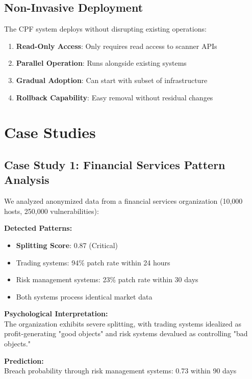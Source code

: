 \documentclass[11pt,a4paper]{article}
\begin{document}
\subsection{Non-Invasive Deployment}

The CPF system deploys without disrupting existing operations:

\begin{enumerate}
\item \textbf{Read-Only Access}: Only requires read access to scanner APIs
\item \textbf{Parallel Operation}: Runs alongside existing systems
\item \textbf{Gradual Adoption}: Can start with subset of infrastructure
\item \textbf{Rollback Capability}: Easy removal without residual changes
\end{enumerate}

\section{Case Studies}

\subsection{Case Study 1: Financial Services Pattern Analysis}

We analyzed anonymized data from a financial services organization (10,000 hosts, 250,000 vulnerabilities):

\textbf{Detected Patterns:}
\begin{itemize}
\item \textbf{Splitting Score}: 0.87 (Critical)
\item Trading systems: 94\% patch rate within 24 hours
\item Risk management systems: 23\% patch rate within 30 days
\item Both systems process identical market data
\end{itemize}

\textbf{Psychological Interpretation:}\\
The organization exhibits severe splitting, with trading systems idealized as profit-generating "good objects" and risk systems devalued as controlling "bad objects."

\textbf{Prediction:}\\
Breach probability through risk management systems: 0.73 within 90 days
\end{document}
